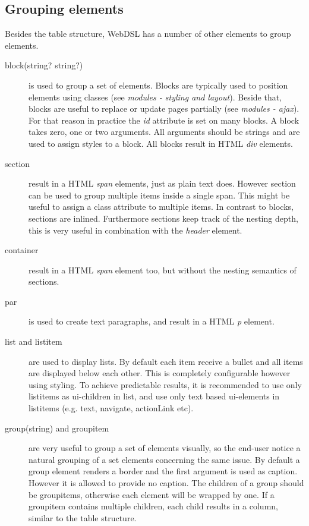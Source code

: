 \subsection{Grouping elements}
Besides the table structure, WebDSL has a number of other elements to group elements. 
\begin{description}
	\item[block(string? string?){}] is used to group a set of elements. Blocks are typically used to position elements
	using classes (see \emph{modules - styling and layout}). Beside that, blocks are useful to replace or update pages partially (see \emph{modules - ajax}). For that reason in practice the \emph{id} attribute is set on many blocks. A block takes zero, one or two arguments. All arguments should be strings and are used to assign styles to a block. All blocks result in HTML \emph{div} elements. 
	\item[section{}] result in a HTML \emph{span} elements, just as plain text does. However section can be used to group multiple items inside a single span. This might be useful to assign a class attribute to multiple items. In contrast to blocks, sections are inlined. Furthermore sections keep track of the nesting depth, this is very useful in combination with the \emph{header} element. 
	\item[container{}] result in a HTML \emph{span} element too, but without the nesting semantics of sections. 
	\item[par{}] is used to create text paragraphs, and result in a HTML \emph{p} element. 
	\item[list{} and listitem{}] are used to display lists. By default each item receive a bullet and all items are displayed below each other. This is completely configurable however using styling. To achieve predictable results, it is recommended to use only listitems as ui-children in list, and use only text based ui-elements in listitems (e.g. text, navigate, actionLink etc). 

	\item[group(string){} and groupitem{}] are very useful to group a set of elements visually, so the end-user notice a natural grouping of a set elements concerning the same issue. By default a group element renders a border and the first argument is used as caption. However it is allowed to provide no caption. The children of a group should be groupitems, otherwise each element will be wrapped by one. If a groupitem contains multiple children, each child results in a column, similar to the table structure. 
\end{description}

